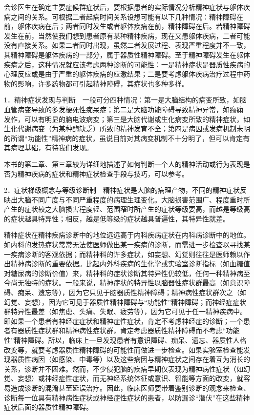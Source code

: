会诊医生在确定主要症候群症状后，要根据患者的实际情况分析精神症状与躯体疾病之间的关系。可根据二者起病时间关系设想可能有以下几种情况：精神障碍在前，躯体疾病在后；两者同时发生或者躯体疾病在前，精神障碍在后。若精神障碍发生在前，当然使我们想到患者原有某种精神疾病，现在又患躯体疾病，二者可能没有直接关系。如果二者同时出现，虽然二者发展过程、表现严重程度并不一致，其精神障碍是躯体疾病的一部分，属于器质性精神障碍。至于精神障碍发生在躯体疾病之后，这种情况就应该考虑两种诊断的可能性：一是精神症状是器质性疾病的心理反应或是由于严重的躯体疾病的应激结果；二是要考虑躯体疾病治疗过程中药物的影响，许多药物都可引起精神障碍，其症状也多种多样。

1．精神症状发现与判断　一般可分四种情况：第一是大脑结构的病变所致，如脑血管病变导致的多发梗死性痴呆症；第二是大脑功能障碍导致精神异常，如癫痫
发作，可以有明显的脑电波病变；第三是大脑代谢或生化病变所致的精神症状，如生化代谢病变（为某种酶缺乏）所致的精神发育不全；第四是病因或发病机制未明的所谓``功能性''精神病的症状，虽说目前对其病变机制不十分明了，但可以肯定有其病理基础，有待我们发现。

本书的第二章、第三章较为详细地描述了如何判断一个人的精神活动或行为表现是否为精神疾病的症状和精神症状检查手段与技巧，可以参考。

2．症状梯级概念与等级诊断制　精神症状是大脑的病理产物，不同的精神症状反映出大脑不同广度与不同严重程度的病理生理变化。大脑损害范围广、程度重时所产生的症状较之大脑损害程度轻、范围窄时所产生的症状等级要高，而越是等级高的症状越具特异性；相反，越是低等级的症状越具普遍性，其特异性就差。

精神症状在精神疾病诊断中的地位远远高于内科疾病症状在内科病诊断中的地位。如内科的发热症状常常无法使医师做出某一疾病的诊断，而需进一步检查以寻找某一疾病诊断的客观依据；而精神科的许多症状，如妄想、幻觉则往往是医师赖以作出精神病诊断的重要依据。比起内外科疾病的生化学或实验室诊断指标（如血糖值对糖尿病的诊断价值）来，精神科的症状诊断其特异性仍较低，任何一种精神病至今尚无独特的症状。一般来说，精神症状的特异性以脑器性症状群最高（如意识障碍、痴呆、遗忘等），因为它只见于脑器质性精神障碍；精神病性症状群次之（如幻觉、妄想），因为它可见于器质性精神障碍与``功能性''精神障碍；而神经症症状群特异性最差（如焦虑、头痛、失眠、疲劳等），因为它可见于任一精神疾病中。即如果一个患者有神经症症状和精神症性症状，肯定不考虑神经症的诊断；一个患者有器质性症状群和精神病性症状群，肯定考虑器质性精神障碍而不考虑``功能性''精神障碍。所以，临床上一旦发现患者有意识障碍、痴呆、遗忘、器质性人格改变等，就要考虑器质性精神障碍的可能性而做进一步检查。如果实验室检查能发现器质性病因（如感染、中毒等）以及这些病因与精神症状之间存在着互为消长的关系，诊断并不困难。然而，不少侵犯脑的疾病早期仅表现为精神病性症状（如幻觉、妄想）或神经症性症状，而无神经系统体征或意识、智能等方面的改变，就容易造成诊断的混淆甚至延误治疗。因此，临床医师要带着鉴别诊断的观念来检查、诊断每一位具有精神病性症状或神经症性症状的患者，以防漏诊``潜伏''在这些精神症状后面的器质性精神障碍。


